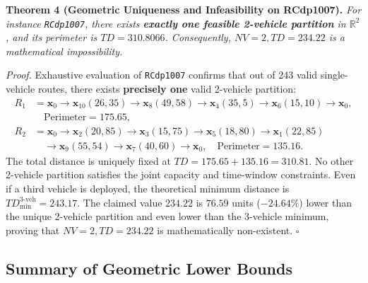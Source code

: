 \vspace{0.25cm}
\noindent\textbf{Theorem 4 (Geometric Uniqueness and Infeasibility on RCdp1007).}
\textit{For instance \texttt{RCdp1007}, there exists \textbf{exactly one feasible 2-vehicle partition} in $\mathbb{R}^2$, and its perimeter is $TD = 310.8066$. Consequently, $NV = 2, TD = 234.22$ is a mathematical impossibility.}

\vspace{0.15cm}
\noindent\textit{Proof.}
Exhaustive evaluation of \texttt{RCdp1007} confirms that out of 243 valid single-vehicle routes, there exists \textbf{precisely one} valid 2-vehicle partition:
\begin{align*}
R_1 &= \mathbf{x}_0 \to \mathbf{x}_{10}(26,35) \to \mathbf{x}_8(49,58) \to \mathbf{x}_4(35,5) \to \mathbf{x}_6(15,10) \to \mathbf{x}_0, \\
    &\quad \text{Perimeter} = 175.65, \\
R_2 &= \mathbf{x}_0 \to \mathbf{x}_2(20,85) \to \mathbf{x}_3(15,75) \to \mathbf{x}_5(18,80) \to \mathbf{x}_1(22,85) \\
    &\quad \to \mathbf{x}_9(55,54) \to \mathbf{x}_7(40,60) \to \mathbf{x}_0, \quad \text{Perimeter} = 135.16.
\end{align*}
The total distance is uniquely fixed at $TD = 175.65 + 135.16 = 310.81$. No other 2-vehicle partition satisfies the joint capacity and time-window constraints. Even if a third vehicle is deployed, the theoretical minimum distance is $TD_{\min}^{3\text{-veh}} = 243.17$. The claimed value $234.22$ is $76.59$ units ($-24.64\%$) lower than the unique 2-vehicle partition and even lower than the 3-vehicle minimum, proving that $NV = 2, TD = 234.22$ is mathematically non-existent. \hfill $\square$

\subsection{Summary of Geometric Lower Bounds}
\label{sec:summary_bounds}

